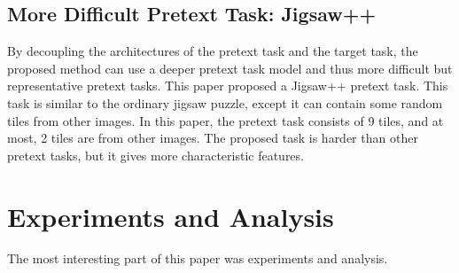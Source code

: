 \documentclass[10pt,twocolumn,letterpaper]{article}
\begin{document}
\subsection{More Difficult Pretext Task: Jigsaw++}
By decoupling the architectures of the pretext task and the target task, the proposed method can use a deeper pretext task model and thus more difficult but representative pretext tasks. This paper proposed a Jigsaw++ pretext task. This task is similar to the ordinary jigsaw puzzle, except it can contain some random tiles from other images. In this paper, the pretext task consists of 9 tiles, and at most, 2 tiles are from other images. The proposed task is harder than other pretext tasks, but it gives more characteristic features.

\section{Experiments and Analysis}
The most interesting part of this paper was experiments and analysis.

{\small

%
}
\end{document}
